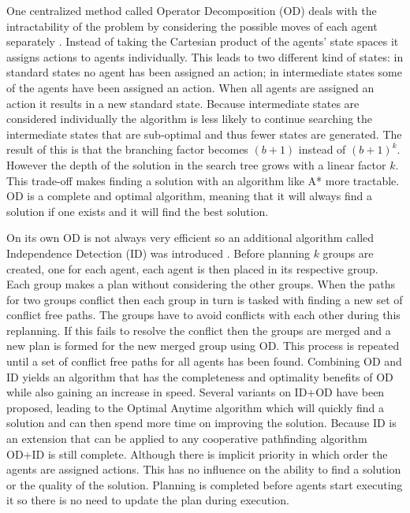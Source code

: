 One centralized method called Operator Decomposition (OD) deals with the
intractability of the problem by considering the possible moves of each agent
separately \cite{standley2010,standley2011}. Instead of taking the Cartesian
product of
the agents' state spaces it assigns actions to agents individually. This leads
to two different kind of states: in standard states no agent has been assigned
an action; in intermediate states some of the agents have been assigned an
action. When all agents are assigned an action it results in a new standard
state. Because intermediate states are considered individually the algorithm is
less likely to continue searching the intermediate states that are sub-optimal
and thus
fewer states are generated. The result of this is that the branching factor
becomes $(b+1)$ instead of $(b+1)^k$. However the depth of the solution in the
search tree grows with a linear factor $k$. This trade-off makes finding a
solution with an algorithm like
A* more tractable. OD is a complete and optimal algorithm, meaning that it will
always find a solution if one exists and it will find the best solution.

On its own OD is not always very efficient so an additional algorithm called
Independence Detection (ID) was introduced \cite{standley2010}. Before planning
$k$ groups are created, one for each agent, each agent is then placed in its
respective group. Each group makes a plan without considering the other groups.
When the paths for two groups conflict then each group in turn is tasked with
finding a new set of conflict free paths. The groups have to avoid conflicts
with each other during this replanning. If this fails to resolve the conflict
then the groups are merged and a new plan is formed for the new merged group
using OD. This process is repeated until a set of conflict free paths for all
agents has been found. Combining OD and ID yields an algorithm that has the
completeness and optimality benefits of OD while also gaining an increase in
speed. Several variants on
ID+OD have been proposed, leading to the Optimal Anytime algorithm
\cite{standley2011} which will quickly find a solution and can then spend more
time on improving the solution. Because ID is an extension that can be applied
to any cooperative pathfinding algorithm OD+ID is still complete. Although
there is implicit priority in which order the agents are assigned actions. This
has no influence on the ability to find a solution or the quality of the
solution. Planning is completed before agents start executing it so there is
no need to update the plan during execution.

